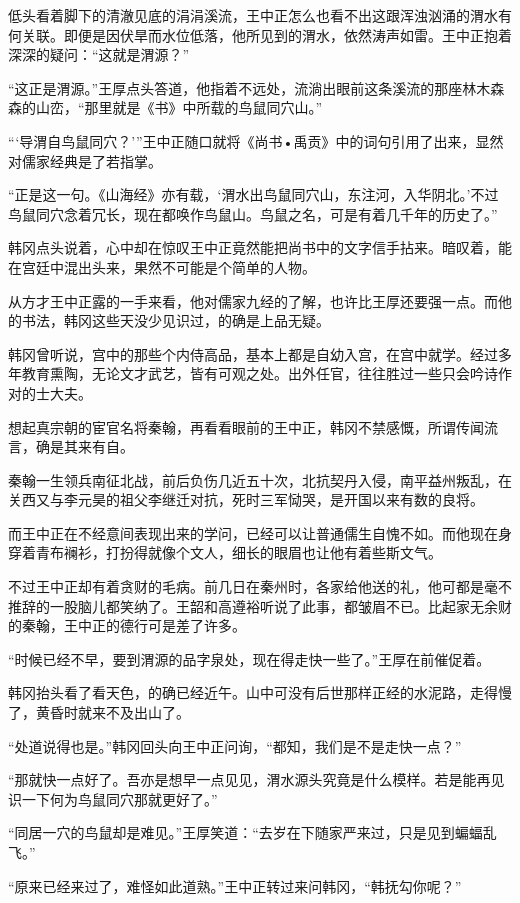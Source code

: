 低头看着脚下的清澈见底的涓涓溪流，王中正怎么也看不出这跟浑浊汹涌的渭水有何关联。即便是因伏旱而水位低落，他所见到的渭水，依然涛声如雷。王中正抱着深深的疑问：“这就是渭源？”

“这正是渭源。”王厚点头答道，他指着不远处，流淌出眼前这条溪流的那座林木森森的山峦，“那里就是《书》中所载的鸟鼠同穴山。”

“‘导渭自鸟鼠同穴？’”王中正随口就将《尚书•禹贡》中的词句引用了出来，显然对儒家经典是了若指掌。

“正是这一句。《山海经》亦有载，‘渭水出鸟鼠同穴山，东注河，入华阴北。’不过鸟鼠同穴念着冗长，现在都唤作鸟鼠山。鸟鼠之名，可是有着几千年的历史了。”

韩冈点头说着，心中却在惊叹王中正竟然能把尚书中的文字信手拈来。暗叹着，能在宫廷中混出头来，果然不可能是个简单的人物。

从方才王中正露的一手来看，他对儒家九经的了解，也许比王厚还要强一点。而他的书法，韩冈这些天没少见识过，的确是上品无疑。

韩冈曾听说，宫中的那些个内侍高品，基本上都是自幼入宫，在宫中就学。经过多年教育熏陶，无论文才武艺，皆有可观之处。出外任官，往往胜过一些只会吟诗作对的士大夫。

想起真宗朝的宦官名将秦翰，再看看眼前的王中正，韩冈不禁感慨，所谓传闻流言，确是其来有自。

秦翰一生领兵南征北战，前后负伤几近五十次，北抗契丹入侵，南平益州叛乱，在关西又与李元昊的祖父李继迁对抗，死时三军恸哭，是开国以来有数的良将。

而王中正在不经意间表现出来的学问，已经可以让普通儒生自愧不如。而他现在身穿着青布襕衫，打扮得就像个文人，细长的眼眉也让他有着些斯文气。

不过王中正却有着贪财的毛病。前几日在秦州时，各家给他送的礼，他可都是毫不推辞的一股脑儿都笑纳了。王韶和高遵裕听说了此事，都皱眉不已。比起家无余财的秦翰，王中正的德行可是差了许多。

“时候已经不早，要到渭源的品字泉处，现在得走快一些了。”王厚在前催促着。

韩冈抬头看了看天色，的确已经近午。山中可没有后世那样正经的水泥路，走得慢了，黄昏时就来不及出山了。

“处道说得也是。”韩冈回头向王中正问询，“都知，我们是不是走快一点？”

“那就快一点好了。吾亦是想早一点见见，渭水源头究竟是什么模样。若是能再见识一下何为鸟鼠同穴那就更好了。”

“同居一穴的鸟鼠却是难见。”王厚笑道：“去岁在下随家严来过，只是见到蝙蝠乱飞。”

“原来已经来过了，难怪如此道熟。”王中正转过来问韩冈，“韩抚勾你呢？”

